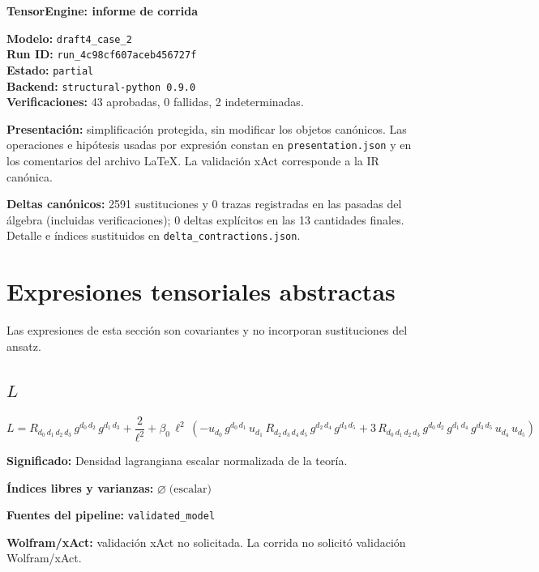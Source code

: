 \documentclass[11pt]{article}
\begin{document}
\begin{center}
{\Large\bfseries TensorEngine: informe de corrida}
\end{center}
\textbf{Modelo:} \texttt{draft4\_case\_2}\\
\textbf{Run ID:} \texttt{run\_4c98cf607aceb456727f}\\
\textbf{Estado:} \texttt{partial}\\
\textbf{Backend:} \texttt{structural-python 0.9.0}\\
\textbf{Verificaciones:} 43 aprobadas, 0 fallidas, 2 indeterminadas.
\par\smallskip
\textbf{Presentación:} simplificación protegida, sin modificar los objetos canónicos. Las operaciones e hipótesis usadas por expresión constan en \texttt{presentation.json} y en los comentarios del archivo LaTeX. La validación xAct corresponde a la IR canónica.\par
\textbf{Deltas canónicos:} 2591 sustituciones y 0 trazas registradas en las pasadas del álgebra (incluidas verificaciones); 0 deltas explícitos en las 13 cantidades finales. Detalle e índices sustituidos en \texttt{delta\_contractions.json}.\par
\section*{Expresiones tensoriales abstractas}
Las expresiones de esta sección son covariantes y no incorporan sustituciones del ansatz.
\subsection*{$ L $}
\begin{dmath*}[breakdepth={5}]
L = R{}_{d_{0}\,d_{1}\,d_{2}\,d_{3}}\,g{}^{d_{0}\,d_{2}}\,g{}^{d_{1}\,d_{3}} + \frac{2}{{\ell}^{2}} + \beta_{0}\,{\ell}^{2}\,\left(-u{}_{d_{0}}\,g{}^{d_{0}\,d_{1}}\,u{}_{d_{1}}\,R{}_{d_{2}\,d_{3}\,d_{4}\,d_{5}}\,g{}^{d_{2}\,d_{4}}\,g{}^{d_{3}\,d_{5}} + 3\,R{}_{d_{0}\,d_{1}\,d_{2}\,d_{3}}\,g{}^{d_{0}\,d_{2}}\,g{}^{d_{1}\,d_{4}}\,g{}^{d_{3}\,d_{5}}\,u{}_{d_{4}}\,u{}_{d_{5}}\right)
\end{dmath*}
\par\vspace{1.2\baselineskip}\noindent
\begin{minipage}{\linewidth}
\textbf{Significado:} Densidad lagrangiana escalar normalizada de la teoría.\par
\textbf{Índices libres y varianzas:} $ \varnothing\;\text{(escalar)} $\par
\textbf{Fuentes del pipeline:} \texttt{validated\_model}\par
\textbf{Wolfram/xAct:} validación xAct no solicitada. La corrida no solicitó validación Wolfram/xAct.\par
\end{minipage}
\end{document}
